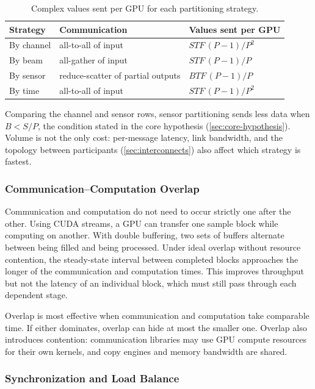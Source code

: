 \begin{table}[H]
  \centering
  \begin{tabular}{@{}lll@{}}
    \toprule
    Strategy & Communication & Values sent per GPU \\
    \midrule
    By channel & all-to-all of input & $STF\,(P-1)/P^2$ \\
    By beam    & all-gather of input & $STF\,(P-1)/P$ \\
    By sensor  & reduce-scatter of partial outputs & $BTF\,(P-1)/P$ \\
    By time    & all-to-all of input & $STF\,(P-1)/P^2$ \\
    \bottomrule
  \end{tabular}
  \caption{Complex values sent per GPU for each partitioning strategy.}
  \label{tab:communication-volume}
\end{table}

Comparing the channel and sensor rows, sensor partitioning sends less data when $B < S/P$, the condition stated in the core hypothesis (\cref{sec:core-hypothesis}). Volume is not the only cost: per-message latency, link bandwidth, and the topology between participants (\cref{sec:interconnects}) also affect which strategy is fastest.

\subsubsection{Communication--Computation Overlap}
\label{sec:communication-computation-overlap}

Communication and computation do not need to occur strictly one after the other. Using CUDA streams, a GPU can transfer one sample block while computing on another. With double buffering, two sets of buffers alternate between being filled and being processed. Under ideal overlap without resource contention, the steady-state interval between completed blocks approaches the longer of the communication and computation times. This improves throughput but not the latency of an individual block, which must still pass through each dependent stage.

Overlap is most effective when communication and computation take comparable time. If either dominates, overlap can hide at most the smaller one. Overlap also introduces contention: communication libraries may use GPU compute resources for their own kernels, and copy engines and memory bandwidth are shared.

\subsubsection{Synchronization and Load Balance}
\label{sec:synchronization-and-load-balance}


